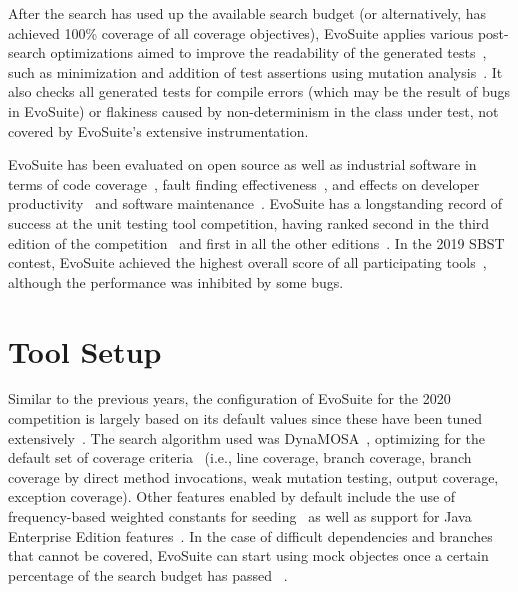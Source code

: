 \documentclass[sigconf]{acmart}
\newcommand{\EVOSUITE}{{\sc EvoSuite}\xspace}
\begin{document}
After the search has used up the available search budget (or alternatively, has
achieved 100\% coverage of all coverage objectives), \EVOSUITE applies various
post-search optimizations aimed to improve the readability of the generated
tests~\cite{FrA11c,FrA13a}, such as minimization and addition of test assertions using mutation
analysis~\cite{10.1109/TSE.2011.93}. It also checks all generated tests for compile errors (which may be the result of bugs in \EVOSUITE) or flakiness caused by non-determinism in the class under test, not covered by \EVOSUITE's extensive instrumentation.


\EVOSUITE has been evaluated on open
source as well as industrial software in terms of code
coverage~\cite{fraser2014large,emse_archive,ea_evaluation,dynamosa},
fault finding
effectiveness~\cite{shamshiri2015automatically,moein2017}, and effects
on developer productivity~\cite{TOSEM_userstudy,ISSTA15_Study} and
software maintenance~\cite{ICST2018_Maintenance}.
%
\EVOSUITE has a longstanding record of success at the unit testing tool
competition, having ranked second in the third edition of the
competition~\cite{evosuiteAtSbst2015} and first in all the other
editions~\cite{evosuiteAtSbst2013,evosuiteAtFittest2013,evosuiteAtSbst2016,evosuiteAtSbst2017,evosuiteAtSbst2018}. In the 2019 SBST contest, \EVOSUITE
achieved the highest overall score of all participating tools~\cite{evosuiteAtSbst2019}, although the
performance was inhibited by some bugs.



\section{Tool Setup}


Similar to the previous years, the configuration of \EVOSUITE for the 2020
competition is largely based on its default values since these have been tuned
extensively~\cite{arcuri2013parameter}. 
%
The search algorithm used was DynaMOSA~\cite{dynamosa}, optimizing for the
default set of coverage criteria~\cite{rojas2015combining} (i.e., line
coverage, branch coverage, branch coverage by direct method invocations, weak
mutation testing, output coverage, exception coverage).
%
Other features enabled by default include the use of frequency-based weighted
constants for seeding~\cite{sakti2015instance} as well as support for Java
Enterprise Edition features~\cite{arcuri2016java}. In the case of difficult dependencies and branches that cannot be covered, \EVOSUITE can start using mock objectes once a certain percentage of the search
budget has passed~\cite{ICST_Mocking17} . 
\end{document}

